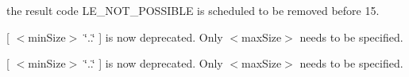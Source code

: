 \begin{DoxyRefList}
\item[\label{deprecated__deprecated000007}%
\hypertarget{deprecated__deprecated000007}{}%
Global \hyperlink{le__thread_8h_adf7f24fec4859ca12a52b16ce43fd9b8}{le\+\_\+thread\+\_\+\+Join} (le\+\_\+thread\+\_\+\+Ref\+\_\+t thread, void $\ast$$\ast$result\+Value\+Ptr)]the result code L\+E\+\_\+\+N\+O\+T\+\_\+\+P\+O\+S\+S\+I\+B\+LE is scheduled to be removed before 15. 
\item[\label{deprecated__deprecated000006}%
\hypertarget{deprecated__deprecated000006}{}%
Global \hyperlink{le__thread_8h_aed0052d639c1f811b87666dfe1d35d8e}{L\+E\+\_\+\+T\+H\+R\+E\+A\+D\+\_\+\+P\+R\+I\+O\+R\+I\+T\+Y\+\_\+\+N\+O\+R\+M\+AL} ]
\item[\label{deprecated__deprecated000001}%
\hypertarget{deprecated__deprecated000001}{}%
Page \hyperlink{apiFilesSyntax}{Syntax} ]\mbox{[} $<$min\+Size$>$ \char`\"{}..\char`\"{} \mbox{]} is now deprecated. Only $<$max\+Size$>$ needs to be specified.

\mbox{[} $<$min\+Size$>$ \char`\"{}..\char`\"{} \mbox{]} is now deprecated. Only $<$max\+Size$>$ needs to be specified.
\end{DoxyRefList}